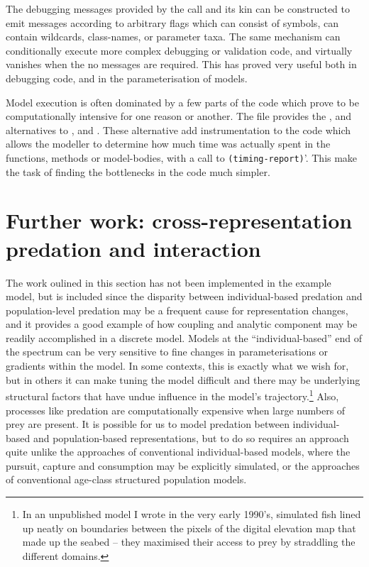 The debugging messages provided by the  call and its
kin can be constructed to emit messages according to arbitrary flags
which can consist of symbols, can contain wildcards, class-names, or
parameter taxa.  The same mechanism can conditionally execute more
complex debugging or validation code, and virtually vanishes when the
no messages are required.  This has proved very useful both in
debugging code, and in the parameterisation of models.

\vspace{3mm}
Model execution is often dominated by a few parts of the code which
prove to be computationally intensive for one reason or another.  The
 file provides the ,
 and 
alternatives to ,  and
. These alternative add instrumentation to the code
which allows the modeller to determine how much time was actually
spent in the functions, methods or model-bodies, with a call
to \texttt{(timing-report)}'.  This make the task of finding the
bottlenecks in the code much simpler.



\section{Further work: cross-representation predation and interaction\label{predation5}}

The work oulined in this section has not been implemented in the
example model, but is included since the disparity between
individual-based predation and population-level predation may be a
frequent cause for representation changes, and it provides a good
example of how coupling and analytic component may be readily
accomplished in a discrete model. Models at the ``individual-based''
end of the spectrum can be very sensitive to fine changes in
parameterisations or gradients within the model.  In some contexts,
this is exactly what we wish for, but in others it can make tuning
the model difficult and there may be underlying structural factors
that have undue influence in the model's trajectory.\footnote{In an
  unpublished model I wrote in the very early 1990's, simulated
  fish lined up neatly on boundaries between the pixels of the digital
  elevation map that made up the seabed -- they maximised their
  access to prey by straddling the different domains.}
Also, processes like predation are computationally expensive when
large numbers of prey are present.  It is possible for us to
model predation between individual-based and population-based
representations, but to do so requires an approach quite unlike the
approaches of conventional individual-based models, where the pursuit,
capture and consumption may be explicitly simulated, or the approaches
of conventional age-class structured population models.

